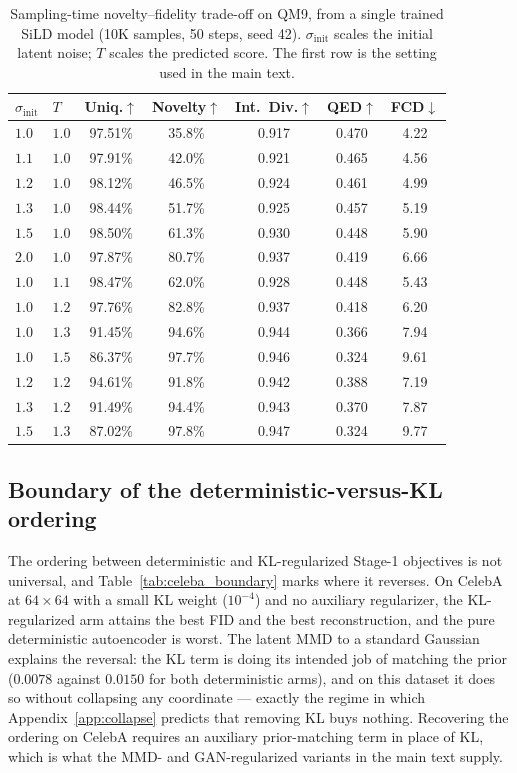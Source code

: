 \begin{table}[h]
\centering
\caption{%
Sampling-time novelty--fidelity trade-off on QM9, from a single trained SiLD
model (10K samples, 50 steps, seed 42). $\sigma_{\mathrm{init}}$ scales the
initial latent noise; $T$ scales the predicted score. The first row is the
setting used in the main text.%
}
\label{tab:novelty_tradeoff}
\small
\begin{tabular}{llccccc}
\toprule
$\sigma_{\mathrm{init}}$ & $T$ & Uniq.$\uparrow$ & Novelty$\uparrow$ & Int.\ Div.$\uparrow$ & QED$\uparrow$ & FCD$\downarrow$ \\
\midrule
$1.0$ & $1.0$ & 97.51\% & 35.8\% & 0.917 & 0.470 & 4.22 \\
$1.1$ & $1.0$ & 97.91\% & 42.0\% & 0.921 & 0.465 & 4.56 \\
$1.2$ & $1.0$ & 98.12\% & 46.5\% & 0.924 & 0.461 & 4.99 \\
$1.3$ & $1.0$ & 98.44\% & 51.7\% & 0.925 & 0.457 & 5.19 \\
$1.5$ & $1.0$ & 98.50\% & 61.3\% & 0.930 & 0.448 & 5.90 \\
$2.0$ & $1.0$ & 97.87\% & 80.7\% & 0.937 & 0.419 & 6.66 \\
\midrule
$1.0$ & $1.1$ & 98.47\% & 62.0\% & 0.928 & 0.448 & 5.43 \\
$1.0$ & $1.2$ & 97.76\% & 82.8\% & 0.937 & 0.418 & 6.20 \\
$1.0$ & $1.3$ & 91.45\% & 94.6\% & 0.944 & 0.366 & 7.94 \\
$1.0$ & $1.5$ & 86.37\% & 97.7\% & 0.946 & 0.324 & 9.61 \\
\midrule
$1.2$ & $1.2$ & 94.61\% & 91.8\% & 0.942 & 0.388 & 7.19 \\
$1.3$ & $1.2$ & 91.49\% & 94.4\% & 0.943 & 0.370 & 7.87 \\
$1.5$ & $1.3$ & 87.02\% & 97.8\% & 0.947 & 0.324 & 9.77 \\
\bottomrule
\end{tabular}
\end{table}

\subsection{Boundary of the deterministic-versus-KL ordering}
\label{app:celeba-boundary}

The ordering between deterministic and KL-regularized Stage-1 objectives is
not universal, and Table~\ref{tab:celeba_boundary} marks where it reverses.
On CelebA at $64\times64$ with a small KL weight ($10^{-4}$) and no auxiliary
regularizer, the KL-regularized arm attains the best FID and the best
reconstruction, and the pure deterministic autoencoder is worst. The latent
MMD to a standard Gaussian explains the reversal: the KL term is doing its
intended job of matching the prior ($0.0078$ against $0.0150$ for both
deterministic arms), and on this dataset it does so without collapsing any
coordinate --- exactly the regime in which Appendix~\ref{app:collapse}
predicts that removing KL buys nothing. Recovering the ordering on CelebA
requires an auxiliary prior-matching term in place of KL, which is what the
MMD- and GAN-regularized variants in the main text supply.

